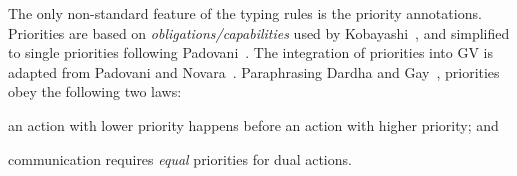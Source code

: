 \documentclass[main.tex]{subfiles}
\begin{document}


The only non-standard feature of the typing rules is the priority annotations. Priorities are based on \emph{obligations/capabilities} used by Kobayashi~\cite{kobayashi06}, and simplified to single priorities following Padovani~\cite{padovani14}. The integration of priorities into GV is adapted from Padovani and Novara~\cite{padovaninovara15}. Paraphrasing Dardha and Gay~\cite{dardhagay18}, priorities obey the following two laws:
\begin{enumerate*}[label=(\roman*)]
\item an action with lower priority happens before an action with higher priority; and
\item communication requires \emph{equal} priorities for dual actions.
\end{enumerate*}
\end{document}
